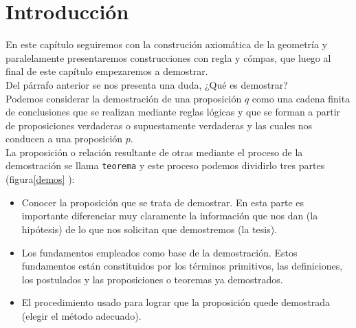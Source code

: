 \documentclass[11pt,spanish,letter]{book}
\newenvironment{lista}{
\begin{itemize}
 \renewcommand{\labelitemi}{{
 \colorbox{blue!90!black}{\color{white}{\ding{42}}}
 }}
}{\end{itemize}}
\newcounter{postulado}[section]
\newcounter{definicion}[section]
\newcounter{teorema}[chapter]
\newcounter{construccion}[section]
\begin{document}
\section*{Introducci\'on}
En este cap\'itulo seguiremos con la construci\'on axiomática de la geometr\'ia
y paralelamente presentaremos construcciones con regla y c\'ompas, que luego al
final de este cap\'itulo empezaremos a demostrar.\\
Del párrafo anterior se nos presenta una duda, ¿Qué es demostrar? \\
Podemos considerar la demostración de una proposición $q$ como una cadena finita
de conclusiones que se realizan mediante reglas lógicas y que se forman a partir
de proposiciones verdaderas o supuestamente verdaderas y las cuales nos conducen
a una proposición $p$.\\
La proposición o relación resultante de otras mediante el proceso de la
demostración se llama \texttt{teorema} y este proceso podemos dividirlo
tres partes (figura\ref{demos} ):
\begin{lista}
\item  Conocer la proposición que se trata de demostrar. En esta parte es
importante diferenciar muy claramente la información que nos dan (la
hipótesis) de lo que nos solicitan que demostremos (la tesis).
\item Los fundamentos empleados como base de la demostración. Estos fundamentos
   están constituidos por los términos primitivos, las definiciones, los
postulados y las proposiciones o teoremas ya demostrados.
\item  El procedimiento usado para lograr que la proposición quede demostrada
(elegir el método adecuado).
\vspace{-20pt} 
\end{lista}
\end{document}

